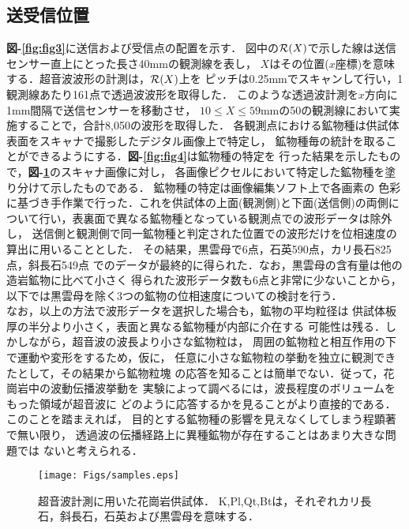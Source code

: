 \subsection{送受信位置}
{\bf 図-\ref{fig:fig3}}に送信および受信点の配置を示す．
図中の${\cal R}(X)$で示した線は送信センサー直上にとった長さ40mmの観測線を表し，
$X$はその位置($x$座標)を意味する．超音波波形の計測は，${\cal R}(X)$上を
ピッチは0.25mmでスキャンして行い，1観測線あたり161点で透過波波形を取得した．
このような透過波計測を$x$方向に1mm間隔で送信センサーを移動させ，
$10\leq X \leq 59$mmの50の観測線において実施することで，合計8,050の波形を取得した．
各観測点における鉱物種は供試体表面をスキャナで撮影したデジタル画像上で特定し，
鉱物種毎の統計を取ることができるようにする．{\bf 図-\ref{fig:fig4}}は鉱物種の特定を
行った結果を示したもので，{\bf 図-\ref{fig:fig1}}のスキャナ画像に対し，
各画像ピクセルにおいて特定した鉱物種を塗り分けて示したものである．
鉱物種の特定は画像編集ソフト上で各画素の
色彩に基づき手作業で行った．これを供試体の上面(観測側)と下面(送信側)の両側に
ついて行い，表裏面で異なる鉱物種となっている観測点での波形データは除外し，
送信側と観測側で同一鉱物種と判定された位置での波形だけを位相速度の算出に用いることとした．
その結果，黒雲母で6点，石英590点，カリ長石825点，斜長石549点
でのデータが最終的に得られた．なお，黒雲母の含有量は他の造岩鉱物に比べて小さく
得られた波形データ数も6点と非常に少ないことから，
以下では黒雲母を除く3つの鉱物の位相速度についての検討を行う．\\
%
\hspace{\parindent}
なお，以上の方法で波形データを選択した場合も，鉱物の平均粒径は
供試体板厚の半分より小さく，表面と異なる鉱物種が内部に介在する
可能性は残る．しかしながら，超音波の波長より小さな鉱物粒は，
周囲の鉱物粒と相互作用の下で運動や変形をするため，仮に，
任意に小さな鉱物粒の挙動を独立に観測できたとして，その結果から鉱物粒塊
の応答を知ることは簡単でない．従って，花崗岩中の波動伝播波挙動を
実験によって調べるには，波長程度のボリュームをもった領域が超音波に
どのように応答するかを見ることがより直接的である．このことを踏まえれば，
目的とする鉱物種の影響を見えなくしてしまう程顕著で無い限り，
透過波の伝播経路上に異種鉱物が存在することはあまり大きな問題では
ないと考えられる．
%
\begin{figure}
\begin{center}
\texttt{[image: Figs/samples.eps]}
\caption{
	超音波計測に用いた花崗岩供試体．
	K,Pl,Qt,Btは，それぞれカリ長石，斜長石，石英および黒雲母を意味する．
}
\label{fig:fig1}
\end{center}
	\vspace{-5mm}
\end{figure}

